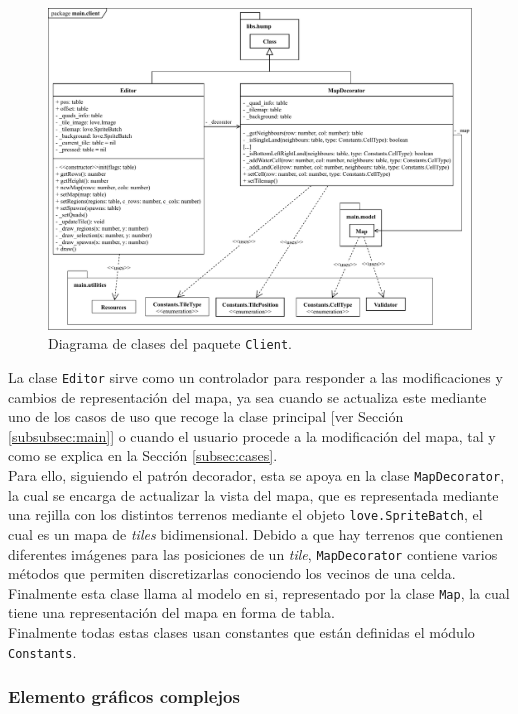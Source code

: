 \begin{figure}[!h]
	\centering
	\includegraphics[width=\textwidth]{images/clase-editor.pdf}
	\caption{Diagrama de clases del paquete \texttt{Client}.}
	\label{fig:editorclass}
\end{figure}

La clase \texttt{Editor} sirve como un controlador para responder a las modificaciones y cambios de representación del mapa, ya sea cuando se actualiza este mediante uno de los casos de uso que recoge la clase principal [ver Sección \ref{subsubsec:main}] o cuando el usuario procede a la modificación del mapa, tal y como se explica en la Sección \ref{subsec:cases}. \\

Para ello, siguiendo el patrón decorador, esta se apoya en la clase \texttt{MapDecorator}, la cual se encarga de actualizar la vista del mapa, que es representada mediante una rejilla con los distintos terrenos mediante el objeto \texttt{love.SpriteBatch}, el cual es un mapa de \textit{tiles} bidimensional. Debido a que hay terrenos que contienen diferentes imágenes para las posiciones de un \textit{tile}, \texttt{MapDecorator} contiene varios métodos que permiten discretizarlas conociendo los vecinos de una celda. Finalmente esta clase llama al modelo en si, representado por la clase \texttt{Map}, la cual tiene una representación del mapa en forma de tabla. \\

Finalmente todas estas clases usan constantes que están definidas el módulo \texttt{Constants}.

\subsubsection{Elemento gráficos complejos}
\label{subsubsec:widgets}

